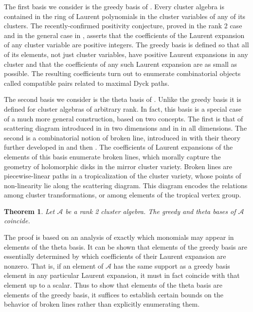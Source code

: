 \documentclass[11pt]{amsart}
\newtheorem{theorem}{Theorem}[section]
\theoremstyle{remark}
\numberwithin{equation}{section}
\begin{document}
The first basis we consider is the greedy basis of \cite{LLZ}.  Every cluster algebra is contained in the ring of Laurent polynomials in the cluster variables of any of its clusters.  The recently-confirmed positivity conjecture, proved in the rank 2 case \cite{LS,Rup} and in the general case in \cite{LS2,GHKK}, asserts that the coefficients of the Laurent expansion of any cluster variable are positive integers.  The greedy basis is defined so that all of its elements, not just cluster variables, have positive Laurent expansions in any cluster and that the coefficients of any such Laurent expansion are as small as possible.  The resulting coefficients turn out to enumerate combinatorial objects called compatible pairs related to maximal Dyck paths.

The second basis we consider is the theta basis of \cite{GHKK}.  Unlike the
greedy basis it is defined for cluster algebras of arbitrary rank.  In fact,
this basis is a special case of a much more general construction, based on two
concepts. The first is that of scattering diagram introduced in \cite{KS} in two
dimensions and in \cite{GS} in all dimensions. The second is a combinatorial
notion of broken line, introduced in \cite{G10} with their theory further
developed in \cite{CPS} and then \cite{GHK11}.  The coefficients of Laurent
expansions of the elements of this basis enumerate broken lines, which morally
capture the geometry of holomorphic disks in the mirror cluster variety.  Broken
lines are piecewise-linear paths in a tropicalization of the cluster variety,
whose points of non-linearity lie along the scattering diagram.  This diagram
encodes the relations among cluster transformations, or among elements of the
tropical vertex group.

\begin{theorem}
Let $\mathcal{A}$ be a rank 2 cluster algebra.  The greedy and theta bases of $\mathcal{A}$ coincide.
\end{theorem}

The proof is based on an analysis of exactly which monomials may appear in elements of the theta basis.  It can be shown that elements of the greedy basis are essentially determined by which coefficients of their Laurent expansion are nonzero.  That is, if an element of $\mathcal{A}$ has the same support as a greedy basis element in any particular Laurent expansion, it must in fact coincide with that element up to a scalar.  Thus to show that elements of the theta basis are elements of the greedy basis, it suffices to establish certain bounds on the behavior of broken lines rather than explicitly enumerating them.
\end{document}

